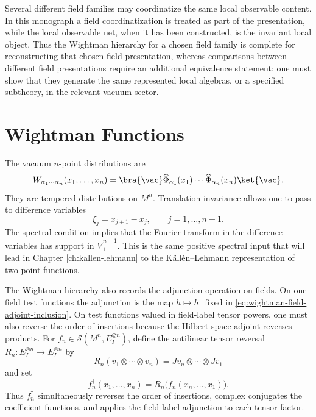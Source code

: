 Several different field families may coordinatize the same local observable
content.  In this monograph a field coordinatization is treated as part of the
presentation, while the local observable net, when it has been constructed, is
the invariant local object.  Thus the Wightman hierarchy for a chosen field
family is complete for reconstructing that chosen field presentation, whereas
comparisons between different field presentations require an additional
equivalence statement: one must show that they generate the same represented
local algebras, or a specified subtheory, in the relevant vacuum sector.

\section{Wightman Functions}

The vacuum \(n\)-point distributions are
\begin{equation}
  W_{\alpha_1\cdots \alpha_n}(x_1,\ldots,x_n)
  =
  \bra{\vac}
  \widehat\Phi_{\alpha_1}(x_1)\cdots\widehat\Phi_{\alpha_n}(x_n)
  \ket{\vac}.
  \label{eq:wightman-functions}
\end{equation}
They are tempered distributions on \(M^n\).  Translation invariance allows one
to pass to difference variables
\[
  \xi_j=x_{j+1}-x_j,\qquad j=1,\ldots,n-1.
\]
The spectral condition implies that the Fourier transform in the difference
variables has support in \(\overline V_+^{\,n-1}\).  This is the same positive
spectral input that will lead in Chapter \ref{ch:kallen-lehmann} to the
K\"all\'en--Lehmann representation of two-point functions.

The Wightman hierarchy also records the adjunction operation on fields.  On
one-field test functions the adjunction is the map \(h\mapsto h^\dagger\) fixed
in \eqref{eq:wightman-field-adjoint-inclusion}.  On test functions valued in
field-label tensor powers, one must also reverse the order of insertions because
the Hilbert-space adjoint reverses products.  For
\(f_n\in\mathcal S(M^n,E_I^{\otimes n})\), define the antilinear tensor
reversal \(R_n:E_I^{\otimes n}\to E_I^{\otimes n}\) by
\[
  R_n(v_1\otimes\cdots\otimes v_n)
  =
  Jv_n\otimes\cdots\otimes Jv_1
\]
and set
\[
  f_n^\dagger(x_1,\ldots,x_n)
  =
  R_n\bigl(f_n(x_n,\ldots,x_1)\bigr).
\]
Thus \(f_n^\dagger\) simultaneously reverses the order of insertions, complex
conjugates the coefficient functions, and applies the field-label adjunction to
each tensor factor.

